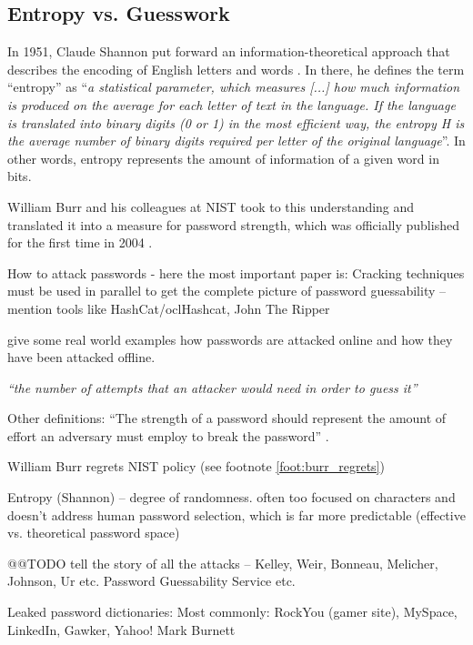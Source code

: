 	\subsection{Entropy vs. Guesswork}
	In 1951, Claude Shannon put forward an information-theoretical approach that describes the encoding of English letters and words \cite{Shannon1951Entropy}. In there, he defines the term ``entropy'' as ``\textit{a statistical parameter, which measures [...] how much information is produced on the average for each letter of text in the language. If the language is translated into binary digits (0 or 1) in the most efficient way, the entropy H is the average number of binary digits required per letter of the original language}''. In other words, entropy represents the amount of information of a given word in bits. 
	
	William Burr and his colleagues at NIST took to this understanding and translated it into a measure for password strength, which was officially published for the first time in 2004 \cite{Burr2004NISTEntropy}.
	
	
	How to attack passwords
	- here the most important paper is:
	Cracking techniques must be used in parallel to get the complete picture of password guessability \cite{Ur2015MeasuringRealWorldAccuracies} -- mention tools like HashCat/oclHashcat, John The Ripper 
	
	give some real world examples how passwords are attacked online and how they have been attacked offline. 
	
	
	\textit{``the number of attempts that an attacker would need in order to guess it''} \cite{Dellamico2015MonteCarlo}
	
	Other definitions: ``The strength of a password should represent the amount of effort an adversary must employ to break the password'' \cite{Carnavalet2014AnalyzingPWStrengthMeters}.
	
	William Burr regrets NIST policy (see footnote \ref{foot:burr_regrets})	
	
	Entropy (Shannon) -- degree of randomness. often too focused on characters and doesn't address human password selection, which is far more predictable 
	(effective vs. theoretical password space)
	
	@@TODO tell the story of all the attacks -- Kelley, Weir, Bonneau, Melicher, Johnson, Ur etc. Password Guessability Service etc. 
	
	Leaked password dictionaries: Most commonly: RockYou (gamer site), MySpace, LinkedIn, Gawker, Yahoo!
	Mark Burnett  \cite{Burnett2005PerfectPasswords} 
	
